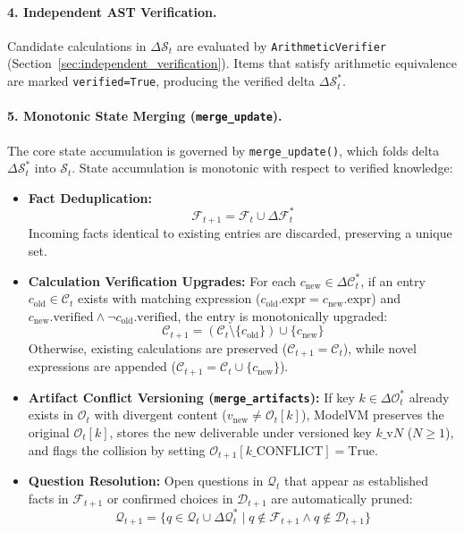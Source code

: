 \paragraph{4. Independent AST Verification.}
Candidate calculations in $\Delta \mathcal{S}_t$ are evaluated by \texttt{ArithmeticVerifier} (Section~\ref{sec:independent_verification}). Items that satisfy arithmetic equivalence are marked \texttt{verified=True}, producing the verified delta $\Delta \mathcal{S}_t^*$.

\paragraph{5. Monotonic State Merging (\texttt{merge\_update}).}
The core state accumulation is governed by \texttt{merge\_update()}, which folds delta $\Delta \mathcal{S}_t^*$ into $\mathcal{S}_t$. State accumulation is monotonic with respect to verified knowledge:
\begin{itemize}
    \item \textbf{Fact Deduplication:}
    \begin{equation}
    \mathcal{F}_{t+1} = \mathcal{F}_t \cup \Delta \mathcal{F}_t^*
    \end{equation}
    Incoming facts identical to existing entries are discarded, preserving a unique set.
    \item \textbf{Calculation Verification Upgrades:} For each $c_{\text{new}} \in \Delta \mathcal{C}_t^*$, if an entry $c_{\text{old}} \in \mathcal{C}_t$ exists with matching expression ($c_{\text{old}}.\text{expr} = c_{\text{new}}.\text{expr}$) and $c_{\text{new}}.\text{verified} \land \neg c_{\text{old}}.\text{verified}$, the entry is monotonically upgraded:
    \begin{equation}
    \mathcal{C}_{t+1} = (\mathcal{C}_t \setminus \{c_{\text{old}}\}) \cup \{c_{\text{new}}\}
    \end{equation}
    Otherwise, existing calculations are preserved ($\mathcal{C}_{t+1} = \mathcal{C}_t$), while novel expressions are appended ($\mathcal{C}_{t+1} = \mathcal{C}_t \cup \{c_{\text{new}}\}$).
    \item \textbf{Artifact Conflict Versioning (\texttt{merge\_artifacts}):} If key $k \in \Delta \mathcal{O}_t^*$ already exists in $\mathcal{O}_t$ with divergent content ($v_{\text{new}} \neq \mathcal{O}_t[k]$), ModelVM preserves the original $\mathcal{O}_t[k]$, stores the new deliverable under versioned key $k\text{\_v}N$ ($N \ge 1$), and flags the collision by setting $\mathcal{O}_{t+1}[k\text{\_CONFLICT}] = \text{True}$.
    \item \textbf{Question Resolution:} Open questions in $\mathcal{Q}_t$ that appear as established facts in $\mathcal{F}_{t+1}$ or confirmed choices in $\mathcal{D}_{t+1}$ are automatically pruned:
    \begin{equation}
    \mathcal{Q}_{t+1} = \{q \in \mathcal{Q}_t \cup \Delta \mathcal{Q}_t^* \mid q \notin \mathcal{F}_{t+1} \land q \notin \mathcal{D}_{t+1}\}
    \end{equation}
\end{itemize}

